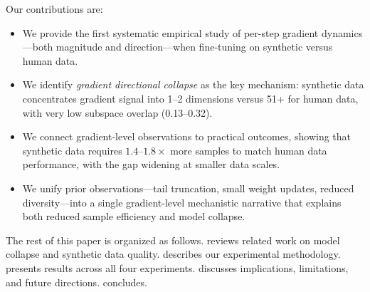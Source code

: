Our contributions are:
\begin{itemize}[leftmargin=*,itemsep=0pt,topsep=0pt]
    \item We provide the first systematic empirical study of per-step gradient dynamics---both magnitude and direction---when fine-tuning on synthetic versus human data.
    \item We identify \emph{gradient directional collapse} as the key mechanism: synthetic data concentrates gradient signal into 1--2 dimensions versus 51+ for human data, with very low subspace overlap (0.13--0.32).
    \item We connect gradient-level observations to practical outcomes, showing that synthetic data requires $1.4$--$1.8\times$ more samples to match human data performance, with the gap widening at smaller data scales.
    \item We unify prior observations---tail truncation, small weight updates, reduced diversity---into a single gradient-level mechanistic narrative that explains both reduced sample efficiency and model collapse.
\end{itemize}

The rest of this paper is organized as follows.  reviews related work on model collapse and synthetic data quality.  describes our experimental methodology.  presents results across all four experiments.  discusses implications, limitations, and future directions.  concludes.
